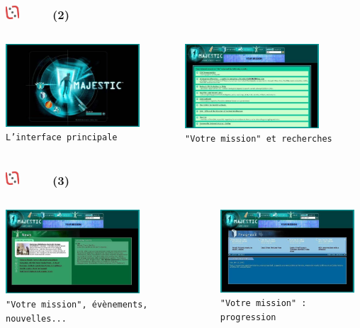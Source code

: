 \documentclass[slidetop,11pt]{beamer}
\def\moreInFrameTitleLeftt{\includegraphics[height=0.5cm]{img/ligueludique-0.png}~~~~~}
\begin{document}
\begin{frame}
	\frametitle{\moreInFrameTitleLeftt \sectionPartIIaV  (2) }
	\begin{columns}[T]
		\begin{column}[T]{5.05cm}
			\includegraphics[width=5.00cm]{img/majesticARGgame/majestic-screenshot-ME0000046986_2.jpg}~\\
			\texttt{\footnotesize L'interface principale }
		\end{column}
		\begin{column}[T]{5.05cm}
			\includegraphics[width=5.00cm]{img/majesticARGgame/majestic-screenshot-ME0000046985_2.jpg}~\\
			\texttt{\footnotesize "Votre mission" et recherches }
		\end{column}
	\end{columns}
\end{frame}

\begin{frame}
	\frametitle{\moreInFrameTitleLeftt \sectionPartIIaV  (3) }
	\begin{columns}[T]
		\begin{column}[T]{5.05cm}
			\includegraphics[width=5.00cm]{img/majesticARGgame/majestic-screenshot-ME0000046987_2.jpg}~\\
			\texttt{\footnotesize "Votre mission", {\'e}v{\`e}nements, nouvelles... }
		\end{column}
		\begin{column}[T]{5.05cm}
			\includegraphics[width=5.00cm]{img/majesticARGgame/majestic-screenshot-ME0000046990_2.jpg}~\\
			\texttt{\footnotesize "Votre mission" : progression }
		\end{column}
	\end{columns}
\end{frame}
\end{document}
